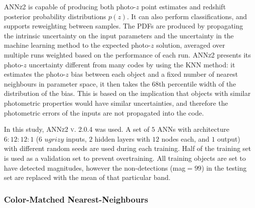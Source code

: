 \textsc{ANNz2} is capable of producing both photo-$z$ point estimates and redshift posterior probability distributions $p(z)$.  It can also perform classifications, and supports reweighting between samples. The PDFs are produced by propagating the intrinsic uncertainty on the input parameters and the uncertainty in the machine learning method to the expected photo-$z$ solution, averaged over multiple runs weighted based on the performance of each run. \textsc{ANNz2} presents its photo-$z$ uncertainty different from many codes by using the KNN method: it estimates the photo-$z$ bias between each object and a fixed number of nearest neighbours in parameter space, it then takes the $68$th percentile width of the distribution of the bias. This is based on the implication that objects with similar photometric properties would have similar uncertainties, and therefore the photometric errors of the inputs are not propagated into the code.

In this study, \textsc{ANNz2 v. 2.0.4} was used. A set of $5$ ANNs with architecture $6:12:12:1$ ($6$ $ugrizy$ inputs, $2$ hidden layers with $12$ nodes each, and $1$ output) with different random seeds are used during each training. %
Half of the training set is used as a validation set to prevent overtraining. All training objects are set to have detected magnitudes, however the non-detections (mag$=99$) in the testing set are replaced with the mean of that particular band.


\subsubsection{Color-Matched Nearest-Neighbours}
\label{sec:cmnn}

